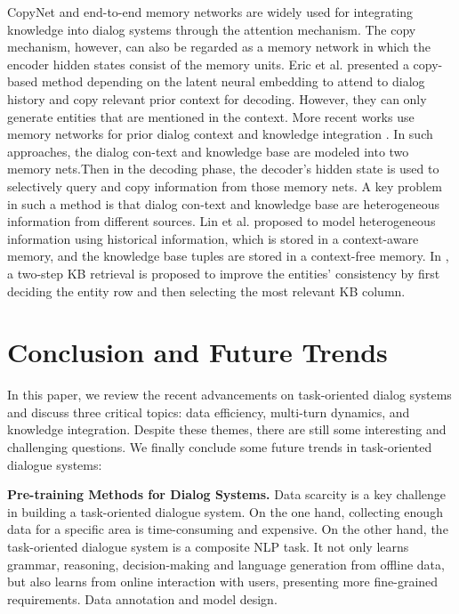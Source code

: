 \documentclass[10pt,twocolumn,letterpaper]{article}
\begin{document}
CopyNet and end-to-end memory networks are widely used for integrating knowledge into dialog systems through the attention mechanism. The copy mechanism, however, can also be regarded as a memory network in which the encoder hidden states consist of the memory units. Eric et al. \cite{eric2017copy}presented a copy-based method depending on the latent neural embedding to attend to dialog history and copy relevant prior context for decoding. However, they can only generate entities that are mentioned in the context. More recent works use memory networks for prior dialog context and knowledge integration \cite{madotto2018mem2seq,wu2019global}. In such approaches, the dialog con-text and knowledge base are modeled into two memory nets.Then in the decoding phase, the decoder's hidden state is used to selectively query and copy information from those memory nets. A key problem in such a method is that dialog con-text and knowledge base are heterogeneous information from different sources. Lin et al. \cite{lin2019task} proposed to model heterogeneous information using historical information, which is stored in a context-aware memory, and the knowledge base tuples are stored in a context-free memory. In \cite{qin2019entity }, a two-step KB retrieval is proposed to improve the entities' consistency by first deciding the entity row and then selecting the most relevant KB column.

\section{Conclusion and Future Trends}
In this paper,  we review the recent advancements on task-oriented dialog systems and discuss three critical topics: data efficiency, multi-turn dynamics, and knowledge integration. Despite these themes, there are still some interesting and challenging questions. We finally conclude some future trends in task-oriented dialogue systems:

\textbf{Pre-training Methods for Dialog Systems.}
Data scarcity is a key challenge in building a task-oriented dialogue system. On the one hand, collecting enough data for a specific area is time-consuming and expensive. On the other hand, the task-oriented dialogue system is a composite NLP task. It not only learns grammar, reasoning, decision-making and language generation from offline data, but also learns from online interaction with users, presenting more fine-grained requirements. Data annotation and model design.
\end{document}
